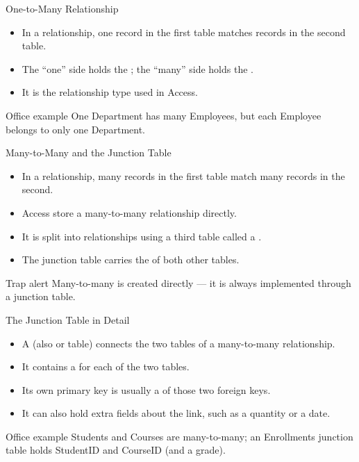 \documentclass[aspectratio=169]{beamer}
\begin{document}
\begin{frame}{One-to-Many Relationship}
  \begin{itemize}
    \item In a  relationship, one record in the first table
      matches  records in the second table.
    \item The ``one'' side holds the ; the ``many'' side
      holds the .
    \item It is the  relationship type used in Access.
  \end{itemize}
  \begin{exampleblock}{Office example}
    One Department has many Employees, but each Employee belongs to only one
    Department.
  \end{exampleblock}
\end{frame}

\begin{frame}{Many-to-Many and the Junction Table}
  \begin{itemize}
    \item In a  relationship, many records in the first
      table match many records in the second.
    \item Access  store a many-to-many relationship directly.
    \item It is split into  relationships using a third
      table called a .
    \item The junction table carries the  of both other
      tables.
  \end{itemize}
  \begin{alertblock}{Trap alert}
    Many-to-many is  created directly --- it is always implemented
    through a junction table.
  \end{alertblock}
\end{frame}

\begin{frame}{The Junction Table in Detail}
  \begin{itemize}
    \item A  (also  or 
      table) connects the two tables of a many-to-many relationship.
    \item It contains a  for each of the two tables.
    \item Its own primary key is usually a  of those two
      foreign keys.
    \item It can also hold extra fields about the link, such as a quantity or
      a date.
  \end{itemize}
  \begin{exampleblock}{Office example}
    Students and Courses are many-to-many; an Enrollments junction table holds
    StudentID and CourseID (and a grade).
  \end{exampleblock}
\end{frame}
\end{document}
